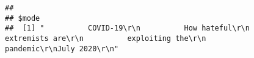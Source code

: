 \documentclass[
]{book}
\begin{document}
\begin{verbatim}
## 
## $mode
##  [1] "          COVID-19\r\n          How hateful\r\n          extremists are\r\n          exploiting the\r\n          pandemic\r\nJuly 2020\r\n"                                                                                                                                                                                                                                                                                                                                                                                                                                                                                                                                                                                                                                                                                                                                                                                                                                                                                                                                                                                                                                                                                                                                                                                                                                                                                                                                                                                                                                                                                                                                                                                                                                                                                                                                                                                                                                                                                                                                                                                                                                                                                                                                                                                                                                                                                                                                                                                                                                                                                                                                                                                                                                                                                                                                                                                                                                                                                                                                                                                                                                                                                                                                                                                                                                                                                      
\end{verbatim}
\end{document}
